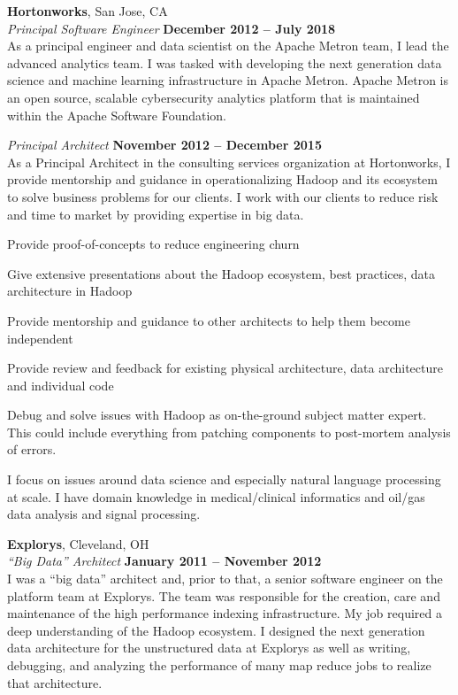 \documentclass[margin,line,12pt]{resume}
\begin{document}
\begin{resume}
    \newpage
    \textbf{Hortonworks}, San Jose, CA \vspace{2mm}\\\vspace{1mm}%
    \textsl{Principal Software Engineer} \hfill \textbf{December 2012 -- July 2018}\\
    As a principal engineer and data scientist on the Apache Metron team, I lead the
    advanced analytics team. I was tasked with developing the next generation data science
    and machine learning infrastructure in Apache Metron.  Apache Metron is an open source,
    scalable cybersecurity analytics platform that is maintained within the
    Apache Software Foundation.

    \vspace*{1mm}

    \textsl{Principal Architect} \hfill \textbf{November 2012 -- December 2015}\\
    As a Principal Architect in the consulting services organization at Hortonworks, I provide
    mentorship and guidance in operationalizing Hadoop and its ecosystem to solve business problems
    for our clients.  I work with our clients to reduce risk and time to market by providing expertise
    in big data.

    \begin{list2}
    \item  Provide proof-of-concepts to reduce engineering churn
    \item  Give extensive presentations about the Hadoop ecosystem, best practices, data architecture in Hadoop
    \item  Provide mentorship and guidance to other architects to help them become independent
    \item  Provide review and feedback for existing physical architecture, data architecture and individual code
    \item  Debug and solve issues with Hadoop as on-the-ground subject matter expert.  This could include everything from patching components to post-mortem analysis of errors.
    \end{list2}

    I focus on issues around data science and especially natural language processing at scale. I have domain knowledge in medical/clinical informatics and oil/gas data analysis and signal processing.

    \textbf{Explorys}, Cleveland, OH \vspace{2mm}\\\vspace{1mm}%
    \textsl{``Big Data'' Architect} \hfill \textbf{January 2011 -- November 2012}\\
    I was a ``big data'' architect and, prior to that, a senior software engineer on the platform team at Explorys. 
    The team was responsible for the creation, care and maintenance of the high performance indexing infrastructure.
    My job required a deep understanding of the Hadoop ecosystem.  I designed the next generation data 
    architecture for the unstructured data at Explorys as well as writing, debugging, and analyzing the 
    performance of many map reduce jobs to realize that architecture.  


\end{resume}
\end{document}

